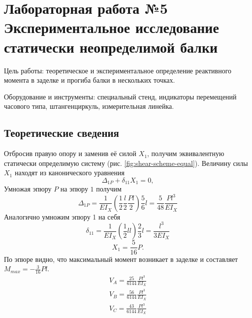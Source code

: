 \chapter{Лабораторная работа №5 \\
\Large Экспериментальное исследование статически неопределимой балки}

Цель работы: теоретическое и экспериментальное определение реактивного момента в заделке и прогиба балки в нескольких точках.

Оборудование и инструменты: специальный стенд, индикаторы перемещений часового типа, штангенциркуль, измерительная линейка.

\section{Теоретические сведения}
Отбросив правую опору и заменив её силой $ X_1 $, получим эквивалентную статически определимую систему (рис. \ref{fig:shear-scheme-equal}).
Величину силы $ X_1 $ находят из канонического уравнения \[ \Delta_{1P} + \delta_{11} X_1 = 0, \]
Умножая эпюру $ P $ на эпюру $ 1 $ получим
\begin{equation}
    \Delta_{1P} = \frac{1}{EI_X} \left(\frac{1}{2} \frac{l}{2} \frac{Pl}{2}\right) \frac{5}{6} l = \frac{5}{48} \frac{Pl^3}{EI_X}
\end{equation}
Аналогично умножим эпюру 1 на себя
\begin{equation}
    \delta_{11} = \frac{1}{EI_X} \left(\frac{1}{2}ll\right) \frac{2}{3}l = \frac{l^3}{3EI_X}
\end{equation}
\begin{equation}
    X_1 = \frac{5}{16}P.
\end{equation}
По эпюре видно, что максимальный момент возникает в заделке и составляет $ M_{max} = -\frac{3}{16}Pl $.
\begin{align*}
    V_A = \frac{25}{6144}\frac{Pl^3}{EI_X} \\
    V_B = \frac{56}{6144}\frac{Pl^3}{EI_X} \\
    V_C = \frac{43}{6144}\frac{Pl^3}{EI_X} \\
\end{align*}


